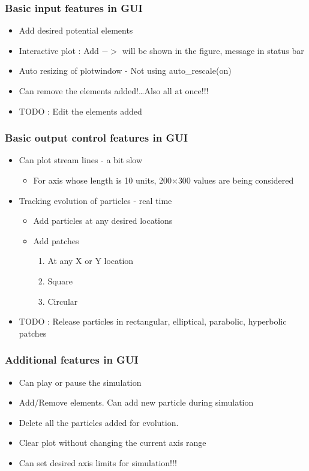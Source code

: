 \documentclass{beamer}
\begin{document}
\begin{frame}
	\frametitle{Basic input features in GUI}
	\begin{itemize}
		\item Add desired potential elements
		\item Interactive plot : \alert{Add} $->$ will be shown in the figure, message in \alert{status bar}
		\item Auto resizing of plotwindow - Not using \alert{auto\_rescale(on)}
			\pause
		\item Can \alert{remove} the elements added!\ldots Also \alert{all} at once!!!
			\pause
		\item \alert{TODO : } Edit the elements added
	\end{itemize}
\end{frame}

\begin{frame}
	\frametitle{Basic output control features in GUI}
	\begin{itemize}
		\item Can plot stream lines - a bit \alert{slow}
	\begin{itemize}
			\item For axis whose length is \alert{10} units, 200$\times$300 values are being considered
			\pause
	\end{itemize}
		\item Tracking evolution of particles - \alert{real time}
			\pause
	\begin{itemize}
			\item Add particles at any desired locations
			\pause
			\item Add patches \begin{enumerate}
				\item At any \alert{X} or \alert{Y} location
				\item Square
				\item Circular
				\end{enumerate}
	\end{itemize}
			\pause
		\item \alert{TODO : } Release particles in rectangular, elliptical, parabolic, hyperbolic patches
	\end{itemize}
\end{frame}

\begin{frame}
	\frametitle{Additional features in GUI}
	\begin{itemize}
		\item Can \alert{play} or \alert{pause} the simulation 
			\pause
		\item Add/Remove elements. Can add new particle during simulation
		\item \alert{Delete} all the particles added for evolution.
			\pause
		\item \alert{Clear plot} without changing the current axis range
			\pause
		\item Can \alert{set} desired \alert{axis limits} for simulation!!!
	\end{itemize}
\end{frame}
\end{document}
